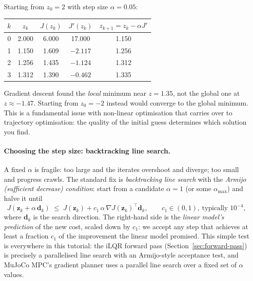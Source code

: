 \documentclass[11pt,twoside]{report}
\theoremstyle{definition}
\theoremstyle{plain}
\theoremstyle{remark}
\newcommand{\0}{\bm{0}}
\begin{document}
\begin{examplebox}[Worked Example 1.2: Gradient descent on $J(z)=z^{4}-4z^{2}+z+4$]
Starting from $z_{0}=2$ with step size $\alpha=0.05$:
\begin{center}
\begin{tabular}{ccccc}
\toprule
$k$ & $z_{k}$ & $J(z_{k})$ & $J'(z_{k})$ & $z_{k+1}=z_{k}-\alpha J'$\\
\midrule
0 & 2.000 & 6.000 & 17.000 & 1.150\\
1 & 1.150 & 1.609 & $-2.117$ & 1.256\\
2 & 1.256 & 1.435 & $-1.124$ & 1.312\\
3 & 1.312 & 1.390 & $-0.462$ & 1.335\\
\bottomrule
\end{tabular}
\end{center}
\begin{warningbox}
Gradient descent found the \emph{local} minimum near $z=1.35$, not the global one at $z\approx -1.47$.
Starting from $z_{0}=-2$ instead would converge to the global minimum.
This is a fundamental issue with non-linear optimisation that carries over to trajectory optimisation:
the quality of the initial guess determines which solution you find.
\end{warningbox}
\end{examplebox}

\paragraph{Choosing the step size: backtracking line search.}
A fixed $\alpha$ is fragile: too large and the iterates overshoot and
diverge; too small and progress crawls. The standard fix is
\emph{backtracking line search} with the \emph{Armijo (sufficient decrease)
condition}: start from a candidate $\alpha=1$ (or some $\alpha_{\max}$) and
halve it until
\begin{equation}\label{eq:armijo}
J(\bm{z}_{k}+\alpha\,\bm{d}_{k})
\;\le\;
J(\bm{z}_{k})+c_{1}\,\alpha\,\nabla J(\bm{z}_{k})^{\!\top}\bm{d}_{k},
\qquad c_{1}\in(0,1),\ \text{typically }10^{-4},
\end{equation}
where $\bm{d}_{k}$ is the search direction.
The right-hand side is the \emph{linear model's prediction} of the new cost,
scaled down by $c_{1}$: we accept any step that achieves at least a fraction
$c_{1}$ of the improvement the linear model promised.
This simple test is everywhere in this tutorial:
the iLQR forward pass (Section~\ref{sec:forward-pass}) is precisely a
parallelised line search with an Armijo-style acceptance test, and
MuJoCo MPC's gradient planner uses a parallel line search over a fixed
set of $\alpha$ values.
\end{document}
